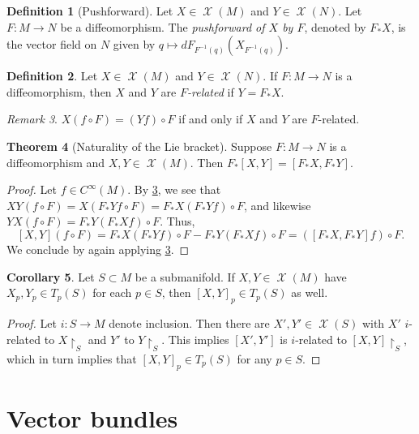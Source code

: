 \documentclass[10pt,letterpaper,cm]{nupset}
\theoremstyle{definition}
\newtheorem{definition}{Definition}[subsection]
\theoremstyle{theorem}
\newtheorem{theorem}[definition]{Theorem}
\newtheorem{corollary}[definition]{Corollary}
\theoremstyle{remark}
\newtheorem{remark}[definition]{Remark}
\newcommand{\1}{\mathbf{1}}
\newcommand{\0}{\vec 0}
\DeclareMathOperator{\vf}{\mathscr{X}}
\begin{document}
\begin{definition}[Pushforward]
Let $X \in \vf(M)$ and $Y \in \vf(N)$. Let $F: M \to N$ be a diffeomorphism. The \textit{pushforward of $X$ by $F$}, denoted by $F_{\ast}X$, is the vector field on $N$ given by $q \mapsto dF_{F^{-1}(q)}\left(X_{F^{-1}(q)}\right)$.
\end{definition}

\begin{definition}
Let $X \in \vf(M)$ and $Y \in \vf(N)$. If $F: M \to N$ is a diffeomorphism, then $X$ and $Y$ are \textit{$F$-related} if $Y = F_{\ast}X$.
\end{definition}

\begin{remark}\label{relat}
$X(f \circ F) = (Yf) \circ F$ if and only if $X$ and $Y$ are $F$-related.
\end{remark}

\begin{theorem}[Naturality of the Lie bracket]
Suppose $F: M \to N$ is a diffeomorphism and $X, Y \in \vf(M)$. Then $F_{\ast}[X, Y] = [F_{\ast}X, F_{\ast}Y]$.
\end{theorem}
\begin{proof}
Let $ f\in C^{\infty}(M)$. By \cref{relat}, we see that $XY(f \circ F) = X(F_{\ast}Yf \circ F) = F_{\ast}X(F_{\ast}Yf) \circ F$, and likewise $YX(f \circ F) = F_{\ast}Y(F_{\ast}X f) \circ F$. Thus, $$[X, Y](f \circ F) = F_{\ast}X(F_{\ast}Yf) \circ F - F_{\ast}Y(F_{\ast}X f) \circ F = ([F_{\ast}X, F_{\ast}Y] f) \circ F.$$ We conclude by again applying \cref{relat}.
\end{proof}

\begin{corollary}
Let $S \subset M$ be a submanifold. If $X, Y \in \vf(M)$ have $X_p, Y_p \in T_p(S)$ for each $p\in S$, then $[X, Y]_p \in T_p(S)$ as well.
\end{corollary}
\begin{proof}
Let $i : S \to M$ denote inclusion. Then  there are $X', Y' \in \vf(S)$ with $X'$ $i$-related to $X\restriction_S$ and $Y'$ to $Y\restriction_S$. This implies $[X', Y']$ is $i$-related to $[X, Y]\restriction_S$, which in turn implies that $[X, Y]_p \in T_p(S)$ for any $p\in S$.  
\end{proof}

\section{Vector bundles}
\end{document}
